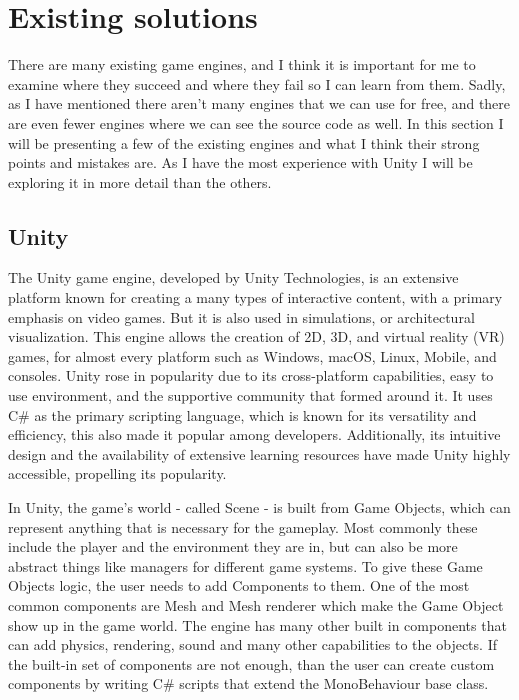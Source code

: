 \chapter{Existing solutions}

There are many existing game engines, and I think it is important for me to examine where they succeed and where they fail so I can learn from them. Sadly, as I have mentioned there aren't many engines that we can use for free, and there are even fewer engines where we can see the source code as well. In this section I will be presenting a few of the existing engines and what I think their strong points and mistakes are.
As I have the most experience with Unity I will be exploring it in more detail than the others.


\section{Unity}

The Unity game engine\cite{unity}, developed by Unity Technologies, is an extensive platform known for creating a many types of interactive content, with a primary emphasis on video games. But it is also used in simulations, or architectural visualization. This engine allows the creation of 2D, 3D, and virtual reality (VR) games, for almost every platform such as Windows, macOS, Linux, Mobile, and consoles. Unity rose in popularity due to its cross-platform capabilities, easy to use environment, and the supportive community that formed around it. It uses C\# as the primary scripting language, which is known for its versatility and efficiency, this also made it popular among developers. Additionally, its intuitive design and the availability of extensive learning resources have made Unity highly accessible, propelling its popularity.

In Unity, the game's world - called Scene - is built from Game Objects, which can represent anything that is necessary for the gameplay. Most commonly these include the player and the environment they are in, but can also be more abstract things like managers for different game systems. To give these Game Objects logic, the user needs to add Components to them. One of the most common components are Mesh and Mesh renderer which make the Game Object show up in the game world. The engine has many other built in components that can add physics, rendering, sound and many other capabilities to the objects. If the built-in set of components are not enough, than the user can create custom components by writing C\# scripts that extend the MonoBehaviour base class.

